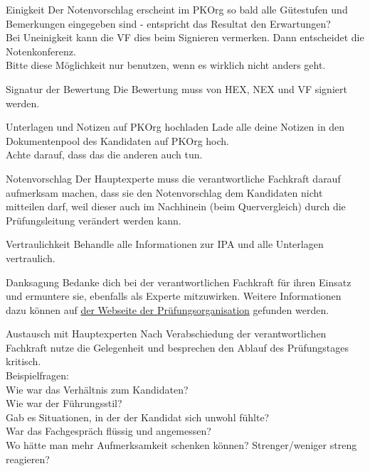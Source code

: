 \begin{taskitem}{Einigkeit}
  Der Notenvorschlag erscheint im PKOrg so bald alle Gütestufen und Bemerkungen eingegeben sind - entspricht das Resultat den Erwartungen?\\
  Bei Uneinigkeit kann die VF dies beim Signieren vermerken. Dann entscheidet die Notenkonferenz.\\
  Bitte diese Möglichkeit nur benutzen, wenn es wirklich nicht anders geht.
\end{taskitem}
\begin{taskitemwithoutcomment}{Signatur der Bewertung}
  Die Bewertung muss von HEX, NEX und VF signiert werden.
\end{taskitemwithoutcomment}
\begin{taskitemwithoutcomment}{Unterlagen und Notizen auf PKOrg hochladen}
  Lade alle deine Notizen in den Dokumentenpool des Kandidaten auf PKOrg hoch.\\
  Achte darauf, dass das die anderen auch tun.
\end{taskitemwithoutcomment}
\begin{taskitemwithoutcomment}{Notenvorschlag}
  Der Hauptexperte muss die verantwortliche Fachkraft darauf aufmerksam machen, dass sie den Notenvorschlag dem Kandidaten nicht mitteilen darf, weil dieser auch im Nachhinein (beim Quervergleich) durch die Prüfungsleitung verändert werden kann.
\end{taskitemwithoutcomment}
\begin{taskitemwithoutcomment}{Vertraulichkeit}
  Behandle alle Informationen zur IPA und alle Unterlagen vertraulich.
\end{taskitemwithoutcomment}
\begin{taskitemwithoutcomment}{Danksagung}
  Bedanke dich bei der verantwortlichen Fachkraft für ihren Einsatz und ermuntere sie, ebenfalls als Experte mitzuwirken. Weitere Informationen dazu können auf \href{https://pk19.ch}{der Webseite der Prüfungsorganisation} gefunden werden.
\end{taskitemwithoutcomment}
\newpage
\begin{taskitem}{Austausch mit Hauptexperten}
  Nach Verabschiedung der verantwortlichen Fachkraft nutze die Gelegenheit und besprechen den Ablauf des Prüfungstages kritisch.\\
  Beispielfragen:\\
  Wie war das Verhältnis zum Kandidaten?\\
  Wie war der Führungsstil?\\
  Gab es Situationen, in der der Kandidat sich unwohl fühlte?\\
  War das Fachgespräch flüssig und angemessen?\\
  Wo hätte man mehr Aufmerksamkeit schenken können? Strenger/weniger streng reagieren?
\end{taskitem}
